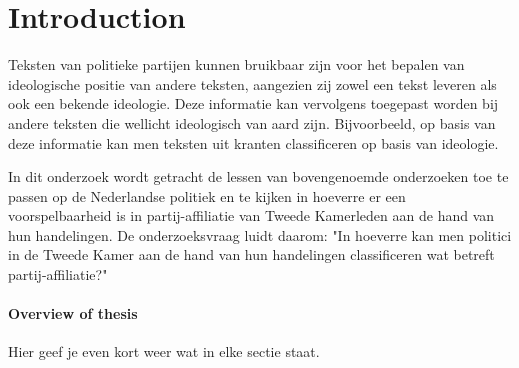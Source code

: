 \section{Introduction}
\label{sec:intro}
Teksten van politieke partijen kunnen bruikbaar zijn voor het bepalen van ideologische positie van andere teksten, aangezien zij zowel een tekst leveren als ook een bekende ideologie. Deze informatie kan vervolgens toegepast worden bij andere teksten die wellicht ideologisch van aard zijn. Bijvoorbeeld, op basis van deze informatie kan men teksten uit kranten classificeren op basis van ideologie.\par

In dit onderzoek wordt getracht de lessen van bovengenoemde onderzoeken toe te passen op de Nederlandse politiek en te kijken in hoeverre er een voorspelbaarheid is in partij-affiliatie van Tweede Kamerleden aan de hand van hun handelingen. De onderzoeksvraag luidt daarom: "In hoeverre kan men politici in de Tweede Kamer aan de hand van hun handelingen classificeren wat betreft partij-affiliatie?"


\paragraph{Overview of thesis}
Hier geef je even kort weer wat in elke sectie staat.
